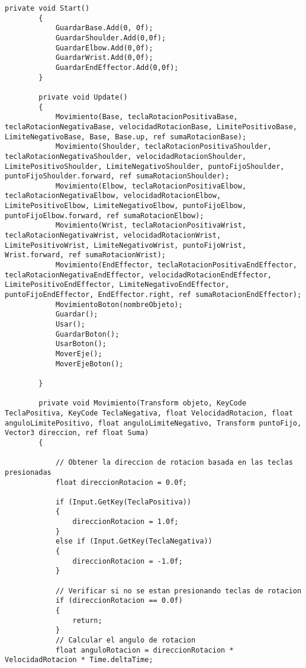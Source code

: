 \begin{lstlisting}[frame=single]
        private void Start()
        {
            GuardarBase.Add(0, 0f);
            GuardarShoulder.Add(0,0f);
            GuardarElbow.Add(0,0f);
            GuardarWrist.Add(0,0f);
            GuardarEndEffector.Add(0,0f);
        }
    
        private void Update()
        {
            Movimiento(Base, teclaRotacionPositivaBase, teclaRotacionNegativaBase, velocidadRotacionBase, LimitePositivoBase, LimiteNegativoBase, Base, Base.up, ref sumaRotacionBase);
            Movimiento(Shoulder, teclaRotacionPositivaShoulder, teclaRotacionNegativaShoulder, velocidadRotacionShoulder, LimitePositivoShoulder, LimiteNegativoShoulder, puntoFijoShoulder, puntoFijoShoulder.forward, ref sumaRotacionShoulder);
            Movimiento(Elbow, teclaRotacionPositivaElbow, teclaRotacionNegativaElbow, velocidadRotacionElbow, LimitePositivoElbow, LimiteNegativoElbow, puntoFijoElbow, puntoFijoElbow.forward, ref sumaRotacionElbow);
            Movimiento(Wrist, teclaRotacionPositivaWrist, teclaRotacionNegativaWrist, velocidadRotacionWrist, LimitePositivoWrist, LimiteNegativoWrist, puntoFijoWrist, Wrist.forward, ref sumaRotacionWrist);
            Movimiento(EndEffector, teclaRotacionPositivaEndEffector, teclaRotacionNegativaEndEffector, velocidadRotacionEndEffector, LimitePositivoEndEffector, LimiteNegativoEndEffector, puntoFijoEndEffector, EndEffector.right, ref sumaRotacionEndEffector);
            MovimientoBoton(nombreObjeto);
            Guardar();
            Usar();
            GuardarBoton();
            UsarBoton();
            MoverEje();
            MoverEjeBoton();
            
        }
     
        private void Movimiento(Transform objeto, KeyCode TeclaPositiva, KeyCode TeclaNegativa, float VelocidadRotacion, float anguloLimitePositivo, float anguloLimiteNegativo, Transform puntoFijo, Vector3 direccion, ref float Suma)
        {
            
            // Obtener la direccion de rotacion basada en las teclas presionadas
            float direccionRotacion = 0.0f;
    
            if (Input.GetKey(TeclaPositiva))
            {
                direccionRotacion = 1.0f;
            }
            else if (Input.GetKey(TeclaNegativa))
            {
                direccionRotacion = -1.0f;
            }
    
            // Verificar si no se estan presionando teclas de rotacion
            if (direccionRotacion == 0.0f)
            {
                return;
            }
            // Calcular el angulo de rotacion
            float anguloRotacion = direccionRotacion * VelocidadRotacion * Time.deltaTime;
            

\end{lstlisting}
